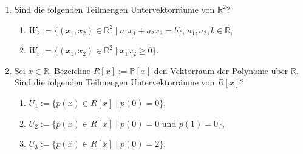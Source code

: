 \documentclass{../problemset}
\begin{document}
\pagebreak

\begin{problem}
\begin{enumerate}
	\item Sind die folgenden Teilmengen Untervektorräume von $\mathbb{R}^2$?
	      \begin{enumerate}[label=\alph*)]
		      \item $W_2 := \{(x_1, x_2) \in \mathbb{R}^2 \mid a_1x_1 + a_2x_2 = b\}$, $a_1, a_2, b \in \mathbb{R}$,
		      \item $W_5 := \{(x_1, x_2) \in \mathbb{R}^2 \mid x_1x_2 \geq 0\}$.
	      \end{enumerate}
	\item Sei $x \in \mathbb{R}$. Bezeichne $R[x] := \mathbb{P}[x]$ den Vektorraum der Polynome über $\mathbb{R}$. Sind die folgenden Teilmengen Untervektorräume von $R[x]$?
	      \begin{enumerate}[label=\alph*)]
		      \item $U_1 := \{p(x) \in R[x] \mid p(0) = 0\}$,
		      \item $U_2 := \{p(x) \in R[x] \mid p(0) = 0 \text{ und } p(1) = 0\}$,
		      \item $U_3 := \{p(x) \in R[x] \mid p(0) = 2\}$.
	      \end{enumerate}
\end{enumerate}
\end{problem}

\pagebreak
\end{document}
